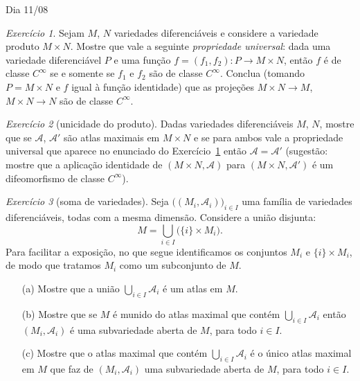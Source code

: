\documentclass[oneside,11pt]{amsart}
\theoremstyle{remark}\newtheorem{exercise}{Exercício}[section]
\theoremstyle{plain}\newtheorem{teo}{Teorema}[section]
\theoremstyle{plain}\newtheorem{lem}[teo]{Lema}
\theoremstyle{plain}\newtheorem{prop}[teo]{Proposição}
\theoremstyle{definition}\newtheorem{defin}[teo]{Definição}
\theoremstyle{remark}\newtheorem{rem}[teo]{Observação}
\theoremstyle{definition}\newtheorem{example}[teo]{Exemplo}
\numberwithin{equation}{section}
\begin{document}
\begin{section}{Dia 11/08}
\begin{exercise}\label{exe:univproduct}
Sejam $M$, $N$ variedades diferenciáveis e considere a variedade produto $M\times N$. Mostre que vale a seguinte {\em propriedade universal}:
dada uma variedade diferenciável $P$ e uma função $f=(f_1,f_2):P\to M\times N$, então $f$ é de classe $C^\infty$ se e somente se $f_1$ e $f_2$ são de
classe $C^\infty$. Conclua (tomando $P=M\times N$ e $f$ igual à função identidade) que as projeções $M\times N\to M$, $M\times N\to N$ são de classe $C^\infty$.
\end{exercise}

\begin{exercise}[unicidade do produto]
Dadas variedades diferenciáveis $M$, $N$, mostre que se $\mathcal A$, $\mathcal A'$ são atlas maximais em $M\times N$ e se para ambos vale a propriedade
universal que aparece no enunciado do Exercício~\ref{exe:univproduct} então $\mathcal A=\mathcal A'$ (sugestão: mostre que a aplicação identidade de
$(M\times N,\mathcal A)$ para $(M\times N,\mathcal A')$ é um difeomorfismo de classe $C^\infty$).
\end{exercise}

\begin{exercise}[soma de variedades]\label{exe:somavariedades}
Seja $\big((M_i,\mathcal A_i)\big)_{i\in I}$ uma família de variedades diferenciáveis, todas com a mesma dimensão. Considere a união disjunta:
\[M=\bigcup_{i\in I}\big(\{i\}\times M_i\big).\]
Para facilitar a exposição, no que segue identificamos os conjuntos $M_i$ e $\{i\}\times M_i$, de modo que tratamos $M_i$ como um subconjunto de $M$.
\begin{itemize}
\item[(a)] Mostre que a união $\bigcup_{i\in I}\mathcal A_i$ é um atlas em $M$.
\item[(b)] Mostre que se $M$ é munido do atlas maximal que contém $\bigcup_{i\in I}\mathcal A_i$ então $(M_i,\mathcal A_i)$ é uma subvariedade
aberta de $M$, para todo $i\in I$.
\item[(c)] Mostre que o atlas maximal que contém $\bigcup_{i\in I}\mathcal A_i$ é o único atlas maximal em $M$ que faz de $(M_i,\mathcal A_i)$ uma subvariedade
aberta de $M$, para todo $i\in I$.
\end{itemize}
\end{exercise}


\end{section}
\end{document}
